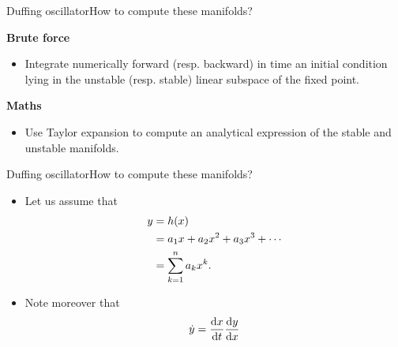 \documentclass[usenames,dvipsnames,svgnames,10pt,aspectratio=169]{beamer}
\begin{document}
\begin{frame}[t, c]{Duffing oscillator}{How to compute these manifolds?}
	\begin{block}{\centering \textbf{Brute force}}
	\end{block}

	\begin{itemize}
		\item Integrate numerically forward (resp. backward) in time an initial condition lying in the unstable (resp. stable) linear subspace of the fixed point.
	\end{itemize}

	\bigskip

	\begin{block}{\centering \textbf{Maths}}
	\end{block}

	\begin{itemize}
		\item Use Taylor expansion to compute an analytical expression of the stable and unstable manifolds.
	\end{itemize}

	\vspace{1cm}
\end{frame}

\begin{frame}[t, c]{Duffing oscillator}{How to compute these manifolds?}
	\begin{itemize}
		\item Let us assume that
		\begin{equation}
			\begin{aligned}
				y & = h(x) \\
				  & = a_1 x + a_2 x^2 + a_3 x^3 + \cdots \\
					& = \sum\limits_{k=1}^n a_k x^k.
			\end{aligned}
			\notag
		\end{equation}

		\bigskip

		\item Note moreover that
		\begin{equation}
			\dot{y} = \displaystyle \frac{\mathrm{d}x}{\mathrm{d}t} \frac{\mathrm{d}y}{\mathrm{d}x}
			\notag
		\end{equation}
	\end{itemize}

	\vspace{1cm}
\end{frame}
\end{document}
